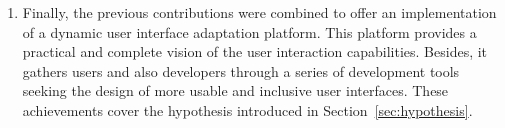 \begin{enumerate}[label=\alph*)]

  \item Finally, the previous contributions were combined to offer an 
  implementation of a dynamic user interface adaptation platform. This platform
  provides a practical and complete vision of the user interaction capabilities.
  Besides, it gathers users and also developers through a series of development
  tools seeking the design of more usable and inclusive user interfaces. These
  achievements cover the hypothesis introduced in Section~\ref{sec:hypothesis}.
  
\end{enumerate}